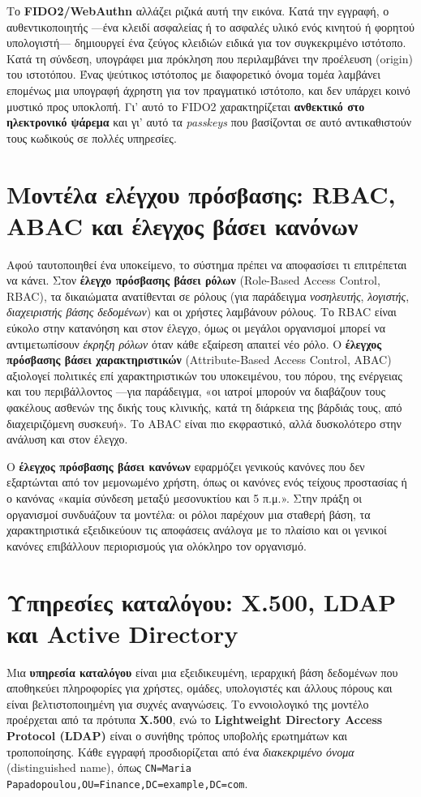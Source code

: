 Το \textbf{FIDO2/WebAuthn} αλλάζει ριζικά αυτή την εικόνα. Κατά την εγγραφή, ο αυθεντικοποιητής —ένα κλειδί ασφαλείας ή το ασφαλές υλικό ενός κινητού ή φορητού υπολογιστή— δημιουργεί ένα ζεύγος κλειδιών ειδικά για τον συγκεκριμένο ιστότοπο. Κατά τη σύνδεση, υπογράφει μια πρόκληση που περιλαμβάνει την προέλευση (origin) του ιστοτόπου. Ένας ψεύτικος ιστότοπος με διαφορετικό όνομα τομέα λαμβάνει επομένως μια υπογραφή άχρηστη για τον πραγματικό ιστότοπο, και δεν υπάρχει κοινό μυστικό προς υποκλοπή. Γι' αυτό το FIDO2 χαρακτηρίζεται \textbf{ανθεκτικό στο ηλεκτρονικό ψάρεμα} και γι' αυτό τα \emph{passkeys} που βασίζονται σε αυτό αντικαθιστούν τους κωδικούς σε πολλές υπηρεσίες.

\section{Μοντέλα ελέγχου πρόσβασης: RBAC, ABAC και έλεγχος βάσει κανόνων}\label{sec:8.3}
Αφού ταυτοποιηθεί ένα υποκείμενο, το σύστημα πρέπει να αποφασίσει τι επιτρέπεται να κάνει. Στον \textbf{έλεγχο πρόσβασης βάσει ρόλων} (Role-Based Access Control, RBAC), τα δικαιώματα ανατίθενται σε ρόλους (για παράδειγμα \emph{νοσηλευτής}, \emph{λογιστής}, \emph{διαχειριστής βάσης δεδομένων}) και οι χρήστες λαμβάνουν ρόλους. Το RBAC είναι εύκολο στην κατανόηση και στον έλεγχο, όμως οι μεγάλοι οργανισμοί μπορεί να αντιμετωπίσουν \emph{έκρηξη ρόλων} όταν κάθε εξαίρεση απαιτεί νέο ρόλο. Ο \textbf{έλεγχος πρόσβασης βάσει χαρακτηριστικών} (Attribute-Based Access Control, ABAC) αξιολογεί πολιτικές επί χαρακτηριστικών του υποκειμένου, του πόρου, της ενέργειας και του περιβάλλοντος —για παράδειγμα, «οι ιατροί μπορούν να διαβάζουν τους φακέλους ασθενών της δικής τους κλινικής, κατά τη διάρκεια της βάρδιάς τους, από διαχειριζόμενη συσκευή». Το ABAC είναι πιο εκφραστικό, αλλά δυσκολότερο στην ανάλυση και στον έλεγχο.

Ο \textbf{έλεγχος πρόσβασης βάσει κανόνων} εφαρμόζει γενικούς κανόνες που δεν εξαρτώνται από τον μεμονωμένο χρήστη, όπως οι κανόνες ενός τείχους προστασίας ή ο κανόνας «καμία σύνδεση μεταξύ μεσονυκτίου και 5 π.μ.». Στην πράξη οι οργανισμοί συνδυάζουν τα μοντέλα: οι ρόλοι παρέχουν μια σταθερή βάση, τα χαρακτηριστικά εξειδικεύουν τις αποφάσεις ανάλογα με το πλαίσιο και οι γενικοί κανόνες επιβάλλουν περιορισμούς για ολόκληρο τον οργανισμό.

\section{Υπηρεσίες καταλόγου: X.500, LDAP και Active Directory}\label{sec:8.4}
Μια \textbf{υπηρεσία καταλόγου} είναι μια εξειδικευμένη, ιεραρχική βάση δεδομένων που αποθηκεύει πληροφορίες για χρήστες, ομάδες, υπολογιστές και άλλους πόρους και είναι βελτιστοποιημένη για συχνές αναγνώσεις. Το εννοιολογικό της μοντέλο προέρχεται από τα πρότυπα \textbf{X.500}, ενώ το \textbf{Lightweight Directory Access Protocol (LDAP)} είναι ο συνήθης τρόπος υποβολής ερωτημάτων και τροποποίησης. Κάθε εγγραφή προσδιορίζεται από ένα \emph{διακεκριμένο όνομα} (distinguished name), όπως \texttt{CN=Maria Papadopoulou,OU=Finance,DC=example,DC=com}.

